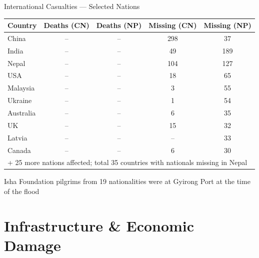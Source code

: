 \documentclass[aspectratio=169, 12pt]{beamer}
\begin{document}
	\begin{frame}{International Casualties --- Selected Nations}
		\small
		\centering
		\renewcommand{\arraystretch}{1.2}
		\begin{tabular}{lcccc}
			\toprule
			\rowcolor{rpOverlay}
			\textbf{Country} & \textbf{Deaths (CN)} &
			\textbf{Deaths (NP)} &
			\textbf{Missing (CN)} & \textbf{Missing (NP)} \\
			\midrule
			China     & -- & -- & 298 & 37  \\
			India     & -- & -- & 49  & 189 \\
			Nepal     & -- & -- & 104 & 127 \\
			USA       & -- & -- & 18  & 65  \\
			Malaysia  & -- & -- & 3   & 55  \\
			Ukraine   & -- & -- & 1   & 54  \\
			Australia & -- & -- & 6   & 35  \\
			UK        & -- & -- & 15  & 32  \\
			Latvia    & -- & -- & --  & 33  \\
			Canada    & -- & -- & 6   & 30  \\
			\midrule
			\multicolumn{5}{l}{{\color{rpMuted}\footnotesize
					+ 25 more nations affected; total 35 countries with nationals missing in Nepal}} \\
			\bottomrule
		\end{tabular}
		\vspace{4pt}
		\begin{alertblock}{}
			 Isha Foundation pilgrims from 19 nationalities were at
			Gyirong Port at the time of the flood
		\end{alertblock}
	\end{frame}
	
	\section{Infrastructure \& Economic Damage}
	
\end{document}
